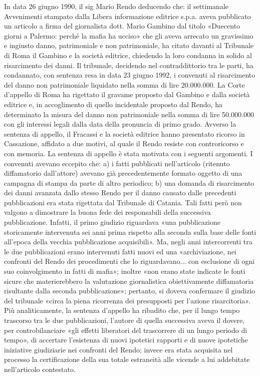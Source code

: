In data 26 giugno 1990, il sig Mario Rendo deducendo che: il settimanale Avvenimenti stampato dalla Libera informazione editrice s.p.a. aveva pubblicato un articolo a firma del giornalista dott. Mario Gambino dal titolo «Duecento giorni a Palermo: perché la mafia ha ucciso» che gli aveva arrecato un gravissimo e ingiusto danno, patrimoniale e non patrimoniale, ha citato davanti al Tribunale di Roma il Gambino e la società editrice, chiedendo la loro condanna in solido al risarcimento dei danni.
Il tribunale, decidendo nel contraddittorio tra le parti, ha condannato, con sentenza resa in data 23 giugno 1992, i convenuti al risarcimento del danno non patrimoniale liquidato nella somma di lire 20.000.000.
La Corte d’appello di Roma ha rigettato il gravame proposto dal Gambino e dalla società editrice e, in accoglimento di quello incidentale proposto dal Rendo, ha determinato la misura del danno non patrimoniale nella somma di lire 50.000.000 con gli interessi legali dalla data della pronuncia di primo grado.
Avverso la sentenza di appello, il Fracassi e la società editrice hanno presentato ricorso in Cassazione, affidato a due motivi, al quale il Rendo resiste con controricorso e con memoria.
La sentenza di appello è stata motivata con i seguenti argomenti.
I convenuti avevano eccepito che: a) i fatti pubblicati nell’articolo (ritenuto diffamatorio dall’attore) avevano già precedentemente formato oggetto di una campagna di stampa da parte di altro periodico; b) una domanda di risarcimento dei danni avanzata dallo stesso Rendo per il danno causato dalle precedenti pubblicazioni era stata rigettata dal Tribunale di Catania.
Tali fatti però non valgono a dimostrare la buona fede dei responsabili della successiva pubblicazione. Infatti, il primo giudizio riguardava «una pubblicazione storicamente intervenuta sei anni prima rispetto alla seconda sulla base delle fonti all’epoca della vecchia pubblicazione acquisibili».
Ma, negli anni intercorrenti tra le due pubblicazioni erano intervenuti fatti nuovi ed una «archiviazione, nei confronti del Rendo dei procedimenti che lo riguardavano... con esclusione di ogni suo coinvolgimento in fatti di mafia»; inoltre «non erano state indicate le fonti sicure che materierebbero la valutazione giornalistica obiettivamente diffamatoria risultante dalla seconda pubblicazione»; pertanto, si doveva confermare il giudizio del tribunale «circa la piena ricorrenza dei presupposti per l’azione risarcitoria».
Più analiticamente, la sentenza d’appello ha ribadito che, per il lungo tempo trascorso tra le due pubblicazioni, l’autore di quella successiva aveva il dovere, per controbilanciare «gli effetti liberatori del trascorrere di un lungo periodo di tempo», di accertare l’esistenza di nuovi ipotetici rapporti e di nuove ipotetiche iniziative giudiziarie nei confronti del Rendo; invece era stata acquisita nel processo la certificazione della sua totale estraneità alle vicende a lui addebitate nell’articolo contestato.
